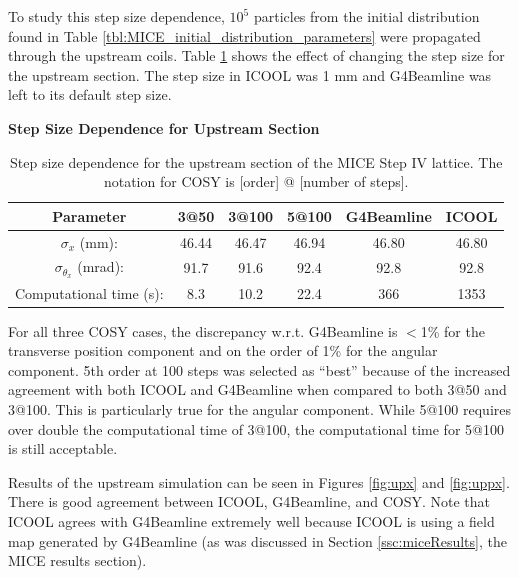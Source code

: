 To study this step size dependence, $10^5$ particles from the initial distribution found in Table \ref{tbl:MICE_initial_distribution_parameters} were propagated through the upstream coils. Table \ref{tbl:mice_step_size_upstream} shows the effect of changing the step size for the upstream section. The step size in ICOOL was 1 mm and G4Beamline was left to its default step size.

\begin{table}
\caption*{\textbf{Step Size Dependence for Upstream Section}}
\begin{center}
\begin{tabularx}{\textwidth}{cccccc}
\hline \hline
Parameter & 3@50 & 3@100 & 5@100 & G4Beamline & ICOOL\\
\hline
$\sigma_x$ (mm): & 46.44 & 46.47 & 46.94 & 46.80 & 46.80\\
$\sigma_{\theta_x}$ (mrad): & 91.7 & 91.6 & 92.4 & 92.8 & 92.8\\
Computational time (s): & 8.3 & 10.2 & 22.4 & 366 & 1353\\
\hline
\end{tabularx}
\end{center}
\caption[Step size dependence for the upstream section of the MICE Step IV lattice.]{Step size dependence for the upstream section of the MICE Step IV lattice. The notation for COSY is [order] @ [number of steps].}
\label{tbl:mice_step_size_upstream}
\end{table}

For all three COSY cases, the discrepancy w.r.t. G4Beamline is  $<$1\% for the transverse position component and on the order of 1\% for the angular component. 5th order at 100 steps was selected as ``best'' because of the increased agreement with both ICOOL and G4Beamline when compared to both 3@50 and 3@100. This is particularly true for the angular component. While 5@100 requires over double the computational time of 3@100, the computational time for 5@100 is still acceptable.

Results of the upstream simulation can be seen in Figures \ref{fig:upx} and \ref{fig:uppx}. There is good agreement between ICOOL, G4Beamline, and COSY. Note that ICOOL agrees with G4Beamline extremely well because ICOOL is using a field map generated by G4Beamline (as was discussed in Section \ref{ssc:miceResults}, the MICE results section).

